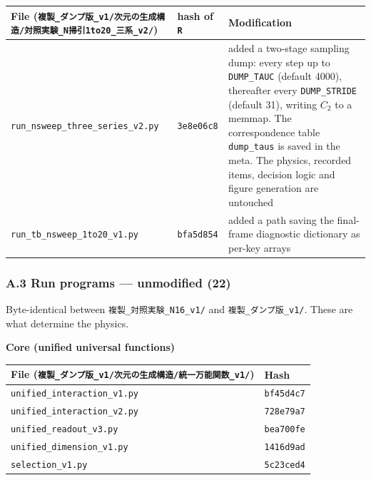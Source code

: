 \documentclass[
  10pt,
]{article}
\newcounter{none} %
\begin{document}
{\def\LTcaptype{none} %
\begin{longtable}[]{@{}
  >{\raggedright\arraybackslash}p{}
  >{\raggedright\arraybackslash}p{}
  >{\raggedright\arraybackslash}p{}@{}}
\toprule\noalign{}
\begin{minipage}[b]{\linewidth}\raggedright
File
(\texttt{複製\_ダンプ版\_v1/次元の生成構造/対照実験\_N掃引1to20\_三系\_v2/})
\end{minipage} & \begin{minipage}[b]{\linewidth}\raggedright
hash of \texttt{R}
\end{minipage} & \begin{minipage}[b]{\linewidth}\raggedright
Modification
\end{minipage} \\
\midrule\noalign{}
\endhead
\bottomrule\noalign{}
\endlastfoot
\texttt{run\_nsweep\_three\_series\_v2.py} & \texttt{3e8e06c8} & added a
two-stage sampling dump: every step up to \texttt{DUMP\_TAUC} (default
4000), thereafter every \texttt{DUMP\_STRIDE} (default 31), writing
\(C_2\) to a memmap. The correspondence table \texttt{dump\_taus} is
saved in the meta. The physics, recorded items, decision logic and
figure generation are untouched \\
\texttt{run\_tb\_nsweep\_1to20\_v1.py} & \texttt{bfa5d854} & added a
path saving the final-frame diagnostic dictionary as per-key arrays \\
\end{longtable}
}

\subsubsection{A.3 Run programs --- unmodified
(22)}\label{a.3-run-programs-unmodified-22}

Byte-identical between \texttt{複製\_対照実験\_N16\_v1/} and
\texttt{複製\_ダンプ版\_v1/}. These are what determine the physics.

\textbf{Core (unified universal functions)}

{\def\LTcaptype{none} %
\begin{longtable}[]{@{}ll@{}}
\toprule\noalign{}
File (\texttt{複製\_ダンプ版\_v1/次元の生成構造/統一万能関数\_v1/}) &
Hash \\
\midrule\noalign{}
\endhead
\bottomrule\noalign{}
\endlastfoot
\texttt{unified\_interaction\_v1.py} & \texttt{bf45d4c7} \\
\texttt{unified\_interaction\_v2.py} & \texttt{728e79a7} \\
\texttt{unified\_readout\_v3.py} & \texttt{bea700fe} \\
\texttt{unified\_dimension\_v1.py} & \texttt{1416d9ad} \\
\texttt{selection\_v1.py} & \texttt{5c23ced4} \\
\end{longtable}
}
\end{document}

